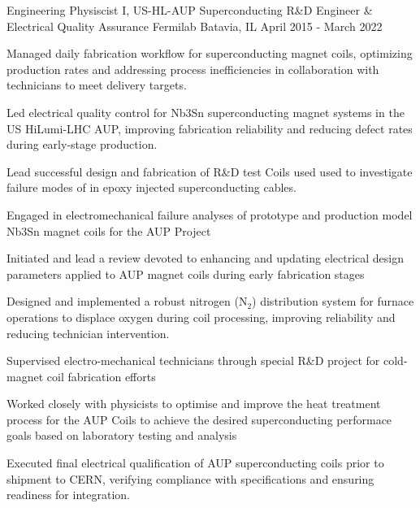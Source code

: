 \begin{cventries}
\cventry
{Engineering Physiscist I, US-HL-AUP Superconducting R\&D Engineer \& Electrical Quality Assurance } %
{Fermilab} %
{Batavia, IL} %
{April 2015 - March 2022} %
{%
\begin{cvitems}
\item {Managed daily fabrication workflow for superconducting magnet coils, optimizing production rates and addressing process inefficiencies in collaboration with technicians to meet delivery targets.}
\item {Led electrical quality control for Nb3Sn superconducting magnet systems in the US HiLumi-LHC AUP, improving fabrication reliability and reducing defect rates during early-stage production.}
\item {Lead successful design and fabrication of R\&D test Coils used used to investigate failure modes of in epoxy injected superconducting cables.}
\item {Engaged in electromechanical failure analyses of prototype and production model Nb3Sn magnet coils for the AUP Project}
\item {Initiated and lead a review devoted to enhancing and updating electrical design parameters applied to AUP magnet coils during early fabrication stages}
\item {Designed and implemented a robust nitrogen (N$_2$) distribution system for furnace operations to displace oxygen during coil processing, improving reliability and reducing technician intervention.}
\item {Supervised electro-mechanical technicians through special R\&D project for cold-magnet coil fabrication efforts}
\item {Worked closely with physicists to optimise and improve the heat treatment process for the AUP Coils to achieve the desired superconducting performace goals based on laboratory testing and analysis} 
\item {Executed final electrical qualification of AUP superconducting coils prior to shipment to CERN, verifying compliance with specifications and ensuring readiness for integration.}
\end{cvitems}
}
\vspace{3mm}


\end{cventries}
